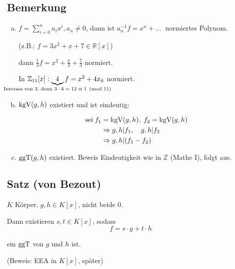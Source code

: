 \subsection{Bemerkung}

\begin{enumerate}[a)]
	\item
	$f = \sum\limits_{i = 0}^n a_ix^i, a_n \neq 0$, dann ist $a_n^{-1}f = x^n + \ldots\;$ normiertes Polynom.
	
	(z.B.: $f = 3x^2+x+7 \in \mathbb{R}[x]$)
	
	dann $\frac{1}{3}f = x^2+\frac{x}{3} + \frac{7}{3}$ normiert.
	
	In $\mathbb{Z}_{11}[x]: \underbrace{4}_{\mathclap{\text{Inverses von 3, denn $3\cdot 4 = 12 \equiv 1 \pmod{11}$}}}f = x^2+4x_6$ normiert.
	
	\item
	$\mathrm{ kgV }(g,h)$ existiert und ist eindeutig:
	
	\begin{align*}
	\text{sei}\; f_1 &= \mathrm{ kgV }(g,h), \; f_2 = \mathrm{ kgV }(g,h)\\
	&\Rightarrow g,h | f_1, \quad g,h | f_2\\
	&\Rightarrow g,h | (f_1-f_2)
	\end{align*}
	
	\item
	$\mathrm{ ggT }(g,h)$ existiert. Beweis Eindeutigkeit wie in $\mathbb{Z}$ (Mathe I), folgt aus.
\end{enumerate}


\subsection{Satz (von Bezout)}
\label{sub:satz_von_bezout_}

$K$ Körper, $g, h \in K[x]$, nicht beide $0$.

Dann existieren $s, t \in K[x]$, sodass
\[f = s \cdot g + t\cdot h\]

ein $\mathrm{ ggT }$ von $g$ und $h$ ist.

(Beweis: EEA in $K[x]$, später)
